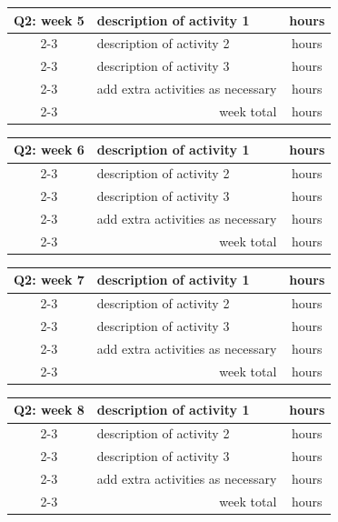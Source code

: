 \documentclass[report,english,cleveref,autoref]{lipics-v2021}
\begin{document}
\begin{tabular}{c| m{10cm}|c}
\hline\hline
Q2: week 5  & description of activity 1 & hours \\
\cline{2-3}
     & description of activity 2 & hours \\
\cline{2-3}
     & description of activity 3 & hours \\
\cline{2-3}
     & add extra activities as necessary & hours \\
\cline{2-3}
     & \multicolumn{1}{r|}{week total} & hours \\
\hline \hline
\end{tabular}
\medskip

\begin{tabular}{c| m{10cm}|c}
\hline\hline
Q2: week 6  & description of activity 1 & hours \\
\cline{2-3}
     & description of activity 2 & hours \\
\cline{2-3}
     & description of activity 3 & hours \\
\cline{2-3}
     & add extra activities as necessary & hours \\
\cline{2-3}
     & \multicolumn{1}{r|}{week total} & hours \\
\hline \hline
\end{tabular}
\medskip

\begin{tabular}{c| m{10cm}|c}
\hline\hline
Q2: week 7  & description of activity 1 & hours \\
\cline{2-3}
     & description of activity 2 & hours \\
\cline{2-3}
     & description of activity 3 & hours \\
\cline{2-3}
     & add extra activities as necessary & hours \\
\cline{2-3}
     & \multicolumn{1}{r|}{week total} & hours \\
\hline \hline
\end{tabular}
\medskip

\begin{tabular}{c| m{10cm}|c}
\hline\hline
Q2: week 8  & description of activity 1 & hours \\
\cline{2-3}
     & description of activity 2 & hours \\
\cline{2-3}
     & description of activity 3 & hours \\
\cline{2-3}
     & add extra activities as necessary & hours \\
\cline{2-3}
     & \multicolumn{1}{r|}{week total} & hours \\
\hline \hline
\end{tabular}
\medskip
\end{document}
